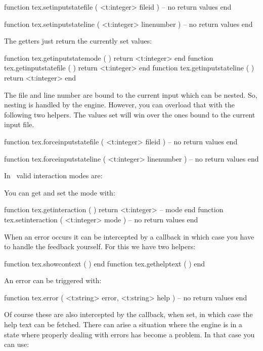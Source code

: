 \starttyping[option=LUA]
function tex.setinputstatefile ( <t:integer> fileid )
    -- no return values
end

function tex.setinputstateline ( <t:integer> linenumber )
    -- no return values
end
\stoptyping

The getters just return the currently set values:

\starttyping[option=LUA]
function tex.getinputstatemode ( ) return <t:integer> end
function tex.getinputstatefile ( ) return <t:integer> end
function tex.getinputstateline ( ) return <t:integer> end
\stoptyping

The file and line number are bound to the current input which can be nested. So,
nesting is handled by the engine. However, you can overload that with the
following two helpers. The values set will win over the ones bound to the current
input file.

\starttyping[option=LUA]
function tex.forceinputstatefile ( <t:integer> fileid )
    -- no return values
end

function tex.forceinputstateline ( <t:integer> linenumber )
    -- no return values
end
\stoptyping

\stopsubsection

\startsubsection[title=Interacting]

In \LUAMETATEX\ valid interaction modes are:

\starttworows
{}
\stoptworows

You can get and set the mode with:

\starttyping[option=LUA]
function tex.getinteraction ( )
    return <t:integer> -- mode
end
function tex.setinteraction ( <t:integer> mode )
    -- no return values
end
\stoptyping

When an error occurs it can be intercepted by a callback in which case you have
to handle the feedback yourself. For this we have two helpers:

\starttyping[option=LUA]
function tex.showcontext ( ) end
function tex.gethelptext ( ) end
\stoptyping

An error can be triggered with:

\starttyping[option=LUA]
function tex.error (
    <t:string> error,
    <t:string> help
)
    -- no return values
end
\stoptyping

Of course these are also intercepted by the callback, when set, in which case the
help text can be fetched. There can arise a situation where the engine is in a
state where properly dealing with errors has become a problem. In that case you
can use:

